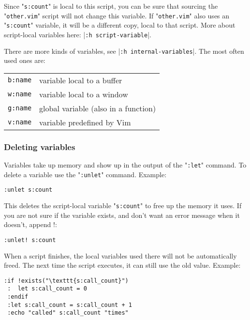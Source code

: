 Since "\texttt{s:count}" is local to this script, you can be sure that sourcing the "\texttt{other.vim}" script will not change this variable.
If "\texttt{other.vim}" also uses an "\texttt{s:count}" variable, it will be a different copy, local to that script.
More about script-local variables here: |\texttt{:h script-variable}|.

There are more kinds of variables, see |\texttt{:h internal-variables}|.
The most often used ones are:

\begin{center} \begin{tabular}{l l}
				\texttt{b:name} & variable local to a buffer \\
				\texttt{w:name} & variable local to a window \\
				\texttt{g:name} & global variable (also in a function) \\
				\texttt{v:name} & variable predefined by Vim \\
\end{tabular} \end{center}
\subsubsection{Deleting variables}
Variables take up memory and show up in the output of the "\texttt{:let}" command.
To delete a variable use the "\texttt{:unlet}" command.
Example:

\begin{Verbatim}[samepage=true]
 :unlet s:count
\end{Verbatim}

This deletes the script-local variable "\texttt{s:count}" to free up the memory it uses.
If you are not sure if the variable exists, and don't want an error message when it doesn't, append !:

\begin{Verbatim}[samepage=true]
 :unlet! s:count
\end{Verbatim}

When a script finishes, the local variables used there will not be automatically freed.
The next time the script executes, it can still use the old value.
Example:

\begin{Verbatim}[samepage=true]
 :if !exists("\texttt{s:call_count}")
 :  let s:call_count = 0
 :endif
 :let s:call_count = s:call_count + 1
 :echo "called" s:call_count "times"
\end{Verbatim}

